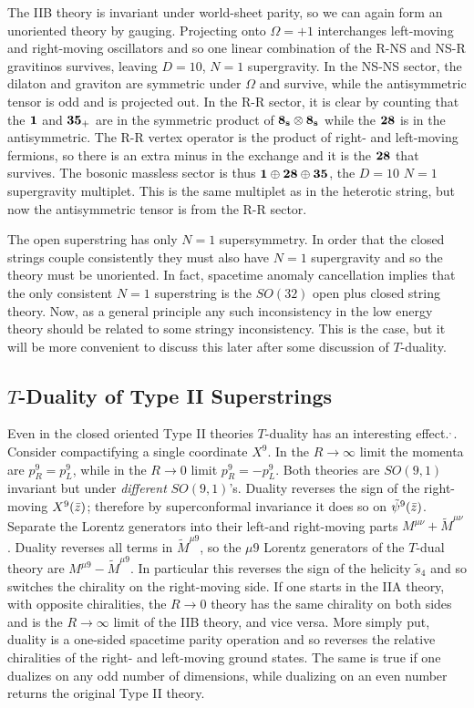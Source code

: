 The IIB theory is invariant under world-sheet parity, so we can again
form an unoriented theory by gauging.  
Projecting onto $\Omega =+1$ interchanges left-moving and right-moving 
oscillators and so one linear combination of the R-NS and NS-R gravitinos
survives, leaving $D=10$, $N=1$ supergravity.  In the NS-NS sector, the
dilaton and graviton are symmetric under $\Omega$ and survive, while the
antisymmetric tensor is odd and is projected out. In the R-R sector, it
is clear by counting that the $\bf 1$ and ${\bf 35}_+$ are in the
symmetric product of ${\bf 8_s} \otimes {\bf 8_s}$ while the $\bf 28$ is
in the antisymmetric.  The R-R vertex operator is the product of right-
and left-moving fermions, so there is an extra minus in the exchange and
it is the $\bf 28$ that survives.  The bosonic massless sector is
thus ${\bf 1} \oplus {\bf 28}  \oplus {\bf 35}$, the $D=10$ $N=1$
supergravity multiplet.  This is the same multiplet as in the heterotic
string, but now the antisymmetric tensor is from the R-R sector.

The open superstring has only $N=1$ supersymmetry.  In order that the
closed strings couple consistently they must also have $N=1$ supergravity
and so the theory must be unoriented.  In fact, spacetime anomaly
cancellation implies that the only consistent $N=1$ superstring is the
$SO(32)$ open plus closed string theory.  Now, as a general principle any
such inconsistency in the low energy theory should be related to some stringy
inconsistency.  This is the case, but it will be more convenient to
discuss this later after some discussion of $T$-duality.

\subsection{$T$-Duality of Type II Superstrings}

Even in the closed oriented Type II theories $T$-duality has an
interesting effect.\cite{dhs}$^{\!,\,}$\cite{dlp}.  Consider
compactifying a single coordinate $X^9$.  In the $R\to \infty$ limit the
momenta are $p^9_R = p^9_L$, while in the $R \to 0$ limit $p^9_R = -p^9_L$. 
Both theories are
$SO(9,1)$ invariant but under {\it different} $SO(9,1)$'s.
Duality reverses the sign of the right-moving $X^9({\bar{z}})$; therefore by
superconformal invariance it does so on $\tilde\psi^9({\bar{z}})$.  Separate the
Lorentz generators into their left-and right-moving parts $M^{\mu\nu} +
\tilde M^{\mu\nu}$. Duality reverses all terms in $\tilde M^{\mu 9}$, so the
$\mu 9$ Lorentz generators of the $T$-dual theory are $M^{\mu 9} - \tilde
M^{\mu 9}$. In particular this reverses the sign of the helicity $\tilde
s_4$ and so switches the chirality on the right-moving side.  If one starts
in the IIA theory, with opposite chiralities, the $R\to 0$ theory has the
same chirality on both sides and is the $R\to\infty$ limit of the IIB theory,
and vice versa.  More simply put, duality is a one-sided spacetime parity
operation and so reverses the relative chiralities of the right- and
left-moving ground states.  The same is true if one dualizes on any odd
number of dimensions, while dualizing on an even number returns the original
Type II theory.

